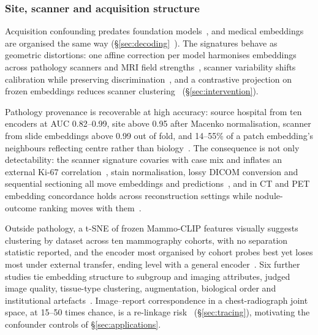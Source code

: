 \subsubsection{Site, scanner and acquisition structure}

Acquisition confounding predates foundation models~\cite{zech2018variable}, and medical embeddings
are organised the same way
(\S\ref{sec:decoding}~\cite{dejong2025current,komen2024do,zheng2024demographic}). The signatures
behave as geometric distortions: one affine correction per model harmonises embeddings across
pathology scanners and MRI field strengths~\cite{donle2026featmap}, scanner variability shifts calibration
while preserving discrimination~\cite{thiringer2026scanner}, and a contrastive projection on frozen
embeddings reduces scanner clustering~\cite{carloni2025pathology} (\S\ref{sec:intervention}).

Pathology provenance is recoverable at high accuracy: source hospital from ten encoders at AUC 0.82--0.99,
site above 0.95 after Macenko normalisation, scanner from slide embeddings above 0.99 out of fold, and
14--55\% of a patch embedding's neighbours reflecting centre rather than
biology~\cite{zhang2025hospital,murchan2024deep,kmen2026robust,jung2026foundation,shafique2026investigating,saueressig2025histology,gustafsson2024evaluating,esbri2025benchmarking}.
The consequence is not only detectability: the scanner signature covaries with case mix and inflates an
external Ki-67 correlation~\cite{jung2026foundation}, stain normalisation, lossy DICOM conversion and
sequential sectioning all move embeddings and
predictions~\cite{wolflein2023benchmarking,mayer2025lossy,balan2025reproducibility}, and in CT and PET
embedding concordance holds across reconstruction settings while nodule-outcome ranking moves with
them~\cite{park2025evaluating,farquhar2026pretraining}.

Outside pathology, a t-SNE of frozen Mammo-CLIP features visually suggests clustering by dataset across ten mammography cohorts, with no separation statistic reported, and
the encoder most organised by cohort probes best yet loses most under external transfer, ending level with a general
encoder~\cite{germani2025bias}. Six further studies tie embedding structure to subgroup and imaging attributes, judged image quality,
tissue-type clustering, augmentation, biological order and institutional
artefacts~\cite{alloula2025representation,ouaari2026assessing,fournier2026prognostic,elphick2024are,vig2026do,zhang2026auditing}.
Image--report correspondence in a chest-radiograph joint space, at 15--50 times chance, is a
re-linkage risk~\cite{tayebiarasteh2026crossmodal} (\S\ref{sec:tracing}), motivating the confounder
controls of \S\ref{sec:applications}.

